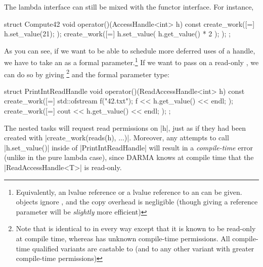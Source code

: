 The \gls{lambda} interface can still be mixed with the functor interface.  For
instance,
\begin{CppCodeNumb}
struct Compute42 {
  void operator()(AccessHandle<int> h) const {
    create_work([=]{
      h.set_value(21);
    });
    create_work([=]{
      h.set_value( h.get_value() * 2 );
    });
  }
};
\end{CppCodeNumb}
As you can see, if we want to be able to schedule more deferred uses of a
\gls{handle}, we have to take an  as a formal
parameter.\footnote{Equivalently, an lvalue reference or a 
lvalue reference to an  can be given. 
 objects ignore , and the copy
overhead is negligible (though giving a reference parameter will be {\it
slightly} more efficient)}  If we want to pass on a read-only , we
can do so by giving \footnote{Note that
is identical to 
in every way except that it is known to be read-only at compile time, whereas
 has unknown compile-time permissions.  All
compile-time qualified  variants are castable to
 (and to any other 
variant with greater compile-time permissions)} and the formal parameter type:
\begin{CppCodeNumb}
struct PrintIntReadHandle {
  void operator()(ReadAccessHandle<int> h) const {
    create_work([=]{
      std::ofstream f("42.txt");
      f << h.get_value() << endl;
    });
    create_work([=]{
      cout << h.get_value() << endl;
    });
  }
};
\end{CppCodeNumb}
The nested \glspl{task} will request read permissions on |h|, just as if they had been
created with |create_work(reads(h), ...)|.  Moreover, any attempts to call
|h.set_value()| inside of |PrintIntReadHandle| will result in a {\it
compile-time} error (unlike in the pure \gls{lambda} case), since \gls{DARMA} knows at
compile time that the |ReadAccessHandle<T>| is read-only.  

